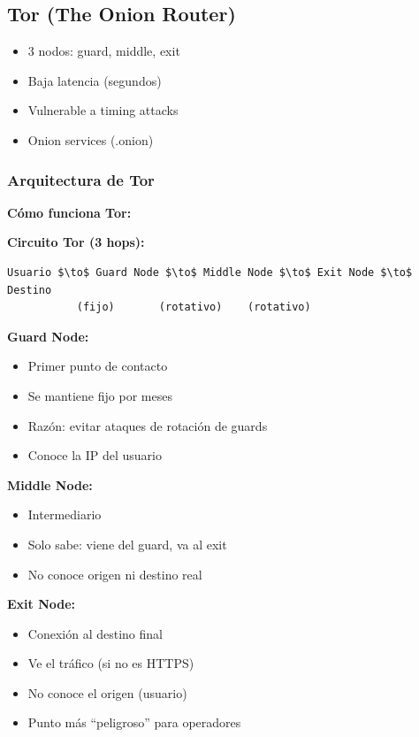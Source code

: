 \documentclass[11pt,a4paper,twoside]{book}
\begin{document}
\subsection{Tor (The Onion Router)}

\begin{itemize}
    \item 3 nodos: guard, middle, exit
    \item Baja latencia (segundos)
    \item Vulnerable a timing attacks
    \item Onion services (.onion)
\end{itemize}

\subsubsection{Arquitectura de Tor}

\begin{mathnote}
\textbf{C\'omo funciona Tor:}

\textbf{Circuito Tor (3 hops):}
\begin{verbatim}
Usuario $\to$ Guard Node $\to$ Middle Node $\to$ Exit Node $\to$ Destino
           (fijo)       (rotativo)    (rotativo)
\end{verbatim}

\textbf{Guard Node:}
\begin{itemize}
    \item Primer punto de contacto
    \item Se mantiene fijo por meses
    \item Raz\'on: evitar ataques de rotaci\'on de guards
    \item Conoce la IP del usuario
\end{itemize}

\textbf{Middle Node:}
\begin{itemize}
    \item Intermediario
    \item Solo sabe: viene del guard, va al exit
    \item No conoce origen ni destino real
\end{itemize}

\textbf{Exit Node:}
\begin{itemize}
    \item Conexi\'on al destino final
    \item Ve el tr\'afico (si no es HTTPS)
    \item No conoce el origen (usuario)
    \item Punto m\'as ``peligroso'' para operadores
\end{itemize}
\end{mathnote}
\end{document}
